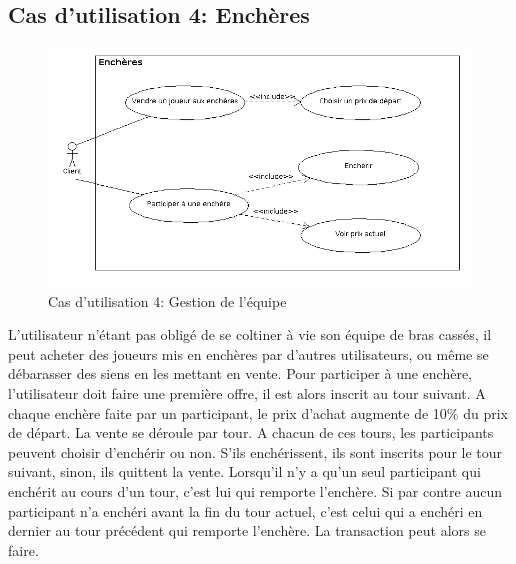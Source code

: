 \documentclass[a4paper,titlepage]{scrreprt}
\begin{document}
  \subsection{Cas d'utilisation 4: Enchères}
  \begin{figure}[H]
    \center
    \includegraphics[scale=0.5]{uml/useCaseView/Encheres.png}
    \caption{Cas d'utilisation 4: Gestion de l'équipe}
  \end{figure}  
    L'utilisateur n'étant pas obligé de se coltiner à vie son équipe de bras cassés, il peut acheter des joueurs mis en enchères par d'autres utilisateurs, ou même se débarasser des siens en les mettant en vente. Pour participer à une enchère, l'utilisateur doit faire une première offre, il est alors inscrit au tour suivant. A chaque enchère faite par un participant, le prix d'achat augmente de 10\% du prix de départ. La vente se déroule par tour. A chacun de ces tours, les participants peuvent choisir d'enchérir ou non. S'ils enchérissent, ils sont inscrits pour le tour suivant, sinon, ils quittent la vente. Lorsqu'il n'y a qu'un seul participant qui enchérit au cours d'un tour, c'est lui qui remporte l'enchère. Si par contre aucun participant n'a enchéri avant la fin du tour actuel, c'est celui qui a enchéri en dernier au tour précédent qui remporte l'enchère. La transaction peut alors se faire. 
\end{document}
